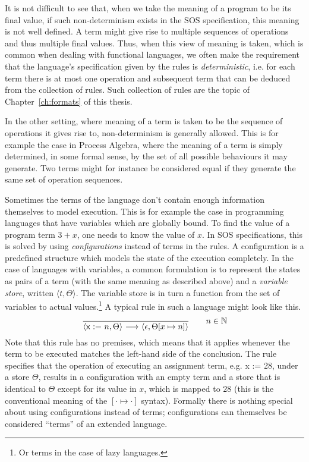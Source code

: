 It is not difficult to see that, when we take the meaning of a program to be its
final value, if such non-determinism exists in the SOS specification, this meaning
is not well defined. A term might give rise to multiple sequences of operations and
thus multiple final values. Thus, when this view of meaning is taken, which is
common when dealing with functional languages, we often make the requirement that
the language's specification given by the rules is \emph{deterministic}, 
i.e. for each term
there is at most one operation and subsequent term that can be deduced from the
collection of rules. Such collection of rules are the topic of Chapter~\ref{ch:formats}
of this thesis.

In the other setting, where meaning of a term is taken to be the sequence of
operations it gives rise to, non-determinism is generally allowed. This is for example
the case in Process Algebra, where the meaning of a term is simply
determined, in some formal sense, by
the set of all possible behaviours it may generate. Two terms might for instance be considered
equal if they generate the same set of operation sequences.

\vspace{1em}

Sometimes the terms of the language don't contain enough information themselves
to model execution. This is for example the case in programming languages that have
variables which are globally bound. To find the value of a program term $3 + x$,
one needs to know the value of $x$. In SOS specifications, this is solved by using
\emph{configurations} instead of terms in the rules. A configuration is a predefined
structure which models the state of the execution completely. In the case of languages
with variables, a common formulation is to represent the states as pairs of a
term (with the same meaning as described above) and a \emph{variable store}, written
$\langle t, \Theta \rangle$. The variable store is in turn a function from the
set of variables to actual values.\footnote{Or terms in the case of lazy languages.}
A typical rule in such a language might look like this.
\begin{equation}\label{eq:intro_rule3}
    \frac{}{\langle \textsf{x := }n, \Theta\rangle \ {\stackrel{{}}{\longrightarrow}}\ 
            \langle \epsilon, \Theta[x\mapsto n]\rangle} \qquad n\in \mathbb{N}
\end{equation}
Note that this rule has no premises, which means that it applies whenever the term
to be executed matches the left-hand side of the conclusion.
The rule specifies that the operation of executing an assignment term, e.g.
\textsf{x := 28}, under a store $\Theta$, results in a configuration with an
empty term and a store that is identical to $\Theta$ except for its value in $x$,
which is mapped to $28$ (this is the conventional meaning of the $[\cdot\mapsto\cdot]$ syntax).
Formally there is nothing special about using configurations instead of terms;
configurations can themselves be considered ``terms'' of an extended language.

